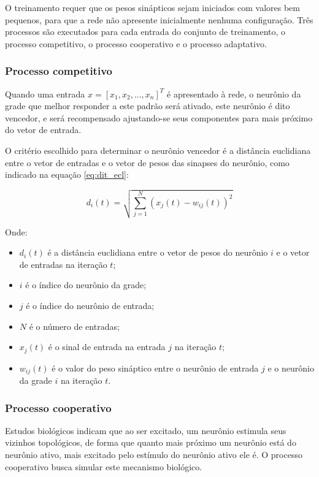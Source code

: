 O treinamento requer que os pesos sinápticos sejam iniciados com valores bem
pequenos, para que a rede não apresente inicialmente nenhuma configuração. Três
processos são executados para cada entrada do conjunto de treinamento, o
processo competitivo, o processo cooperativo e o processo adaptativo.

\subsubsection{Processo competitivo}

Quando uma entrada $ x = \left[x_1, x_2, ..., x_n\right]^T $ é apresentado à
rede, o neurônio da grade que melhor responder a este padrão será ativado, este
neurônio é dito vencedor, e será recompensado ajustando-se seus componentes
para mais próximo do vetor de entrada.

O critério escolhido para determinar o neurônio vencedor é a distância
euclidiana entre o vetor de entradas e o vetor de pesos das sinapses do
neurônio, como indicado na equação \ref{eq:dit_ecl}:

\begin{equation}\label{eq:dit_ecl}
d_i(t) = \sqrt{\sum_{j = 1}^N \left( x_j(t) - w_{ij}(t) \right)^2}
\end{equation}

Onde:

\begin{itemize}
\item $ d_i(t) $ é a distância euclidiana entre o vetor de pesos do
neurônio $ i $ e o vetor de entradas na iteração $ t $;
\item $ i $ é o índice do neurônio da grade;
\item $ j $ é o índice do neurônio de entrada;
\item $ N $ é o número de entradas;
\item $ x_j(t) $ é o sinal de entrada na entrada $ j $ na iteração $ t $;
\item $ w_{ij}(t) $ é o valor do peso sináptico entre o neurônio de
entrada $ j $ e o neurônio da grade $ i $ na iteração $ t $.
\end{itemize}

\subsubsection{Processo cooperativo}

Estudos biológicos indicam que ao ser excitado, um neurônio estimula seus
vizinhos topológicos, de forma que quanto mais próximo um neurônio está do
neurônio ativo, mais excitado pelo estímulo do neurônio ativo ele é. O processo
cooperativo busca simular este mecanismo biológico.

